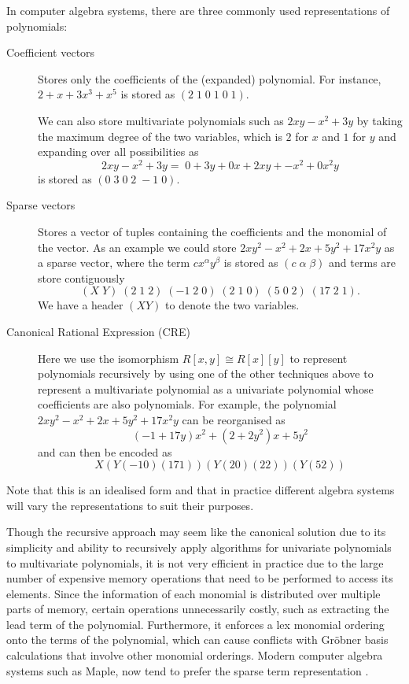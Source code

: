 In computer algebra systems, there are three commonly used representations of polynomials: 
\begin{description}
    \item[Coefficient vectors] Stores only the coefficients of the (expanded) polynomial. For instance, $2 + x + 3x^3 + x^5$ is stored as $(2\; 1\; 0\; 1\; 0\; 1)$.

        We can also store multivariate polynomials such as $2xy - x^2 + 3y$ by taking the maximum degree of the two variables, which is $2$ for $x$ and $1$ for $y$ and expanding over all possibilities as 
        \[
            2xy - x^2 + 3y = \;0 + 3y + 0x + 2xy + \minus x^2 + 0x^2y
        \]
        is stored as  $(0\; 3\; 0\; 2\; \minus 1\; 0)$.
    \item[Sparse vectors] Stores a vector of tuples containing the coefficients and the monomial of the vector. As an example we could store $2xy^2 - x^2 + 2x + 5y^2 + 17x^2 y$ as a sparse vector, where the term $c x^\alpha y^\beta$ is stored as $(c\; \alpha \; \beta)$ and terms are store contiguously
        \[  
            (X\; Y)\; (2\; 1\; 2)\; (\minus 1\; 2\; 0)\; (2\; 1\; 0)\; (5\; 0\; 2)\; (17\; 2\; 1).
        \]
        We have a header $(X Y)$ to denote the two variables.

    \item[Canonical Rational Expression (CRE)] Here we use the isomorphism $R[x, y] \cong R[x][y]$ to represent polynomials recursively by using one of the other techniques above to represent a multivariate polynomial as a univariate polynomial whose coefficients are also polynomials. For example, the polynomial $2xy^2 - x^2 + 2x + 5y^2 + 17x^2 y$ can be reorganised as
        \[
            (\minus 1 + 17y)x^2 + (2 + 2y^2)x + 5y^2
        \]
        and can then be encoded as
        \[
            X ( Y (\minus 1 0) (17 1) ) ( Y (2 0) (2 2) ) ( Y (5 2) ) 
        \]
\end{description}

Note that this is an idealised form and that in practice different algebra systems will vary the representations to suit their purposes. 

\medskip

Though the recursive approach may seem like the canonical solution due to its simplicity and ability to recursively apply algorithms for univariate polynomials to multivariate polynomials, it is not very efficient in practice due to the large number of expensive memory operations that need to be performed to access its elements. Since the information of each monomial is distributed over multiple parts of memory, certain operations unnecessarily costly, such as extracting the lead term of the polynomial. Furthermore, it enforces a lex monomial ordering onto the terms of the polynomial, which can cause conflicts with Gr\"{o}bner basis calculations that involve other monomial orderings. Modern computer algebra systems such as Maple, now tend to prefer the sparse term representation \cite{maple-new-poly-structure}.


